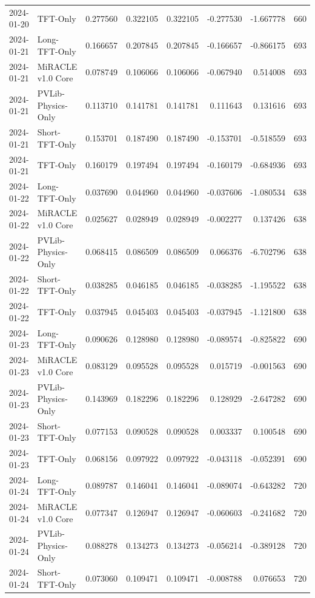 \begin{tabular}{llrrrrrr}
2024-01-20 & TFT-Only & 0.277560 & 0.322105 & 0.322105 & -0.277530 & -1.667778 & 660 \\
2024-01-21 & Long-TFT-Only & 0.166657 & 0.207845 & 0.207845 & -0.166657 & -0.866175 & 693 \\
2024-01-21 & MiRACLE v1.0 Core & 0.078749 & 0.106066 & 0.106066 & -0.067940 & 0.514008 & 693 \\
2024-01-21 & PVLib-Physics-Only & 0.113710 & 0.141781 & 0.141781 & 0.111643 & 0.131616 & 693 \\
2024-01-21 & Short-TFT-Only & 0.153701 & 0.187490 & 0.187490 & -0.153701 & -0.518559 & 693 \\
2024-01-21 & TFT-Only & 0.160179 & 0.197494 & 0.197494 & -0.160179 & -0.684936 & 693 \\
2024-01-22 & Long-TFT-Only & 0.037690 & 0.044960 & 0.044960 & -0.037606 & -1.080534 & 638 \\
2024-01-22 & MiRACLE v1.0 Core & 0.025627 & 0.028949 & 0.028949 & -0.002277 & 0.137426 & 638 \\
2024-01-22 & PVLib-Physics-Only & 0.068415 & 0.086509 & 0.086509 & 0.066376 & -6.702796 & 638 \\
2024-01-22 & Short-TFT-Only & 0.038285 & 0.046185 & 0.046185 & -0.038285 & -1.195522 & 638 \\
2024-01-22 & TFT-Only & 0.037945 & 0.045403 & 0.045403 & -0.037945 & -1.121800 & 638 \\
2024-01-23 & Long-TFT-Only & 0.090626 & 0.128980 & 0.128980 & -0.089574 & -0.825822 & 690 \\
2024-01-23 & MiRACLE v1.0 Core & 0.083129 & 0.095528 & 0.095528 & 0.015719 & -0.001563 & 690 \\
2024-01-23 & PVLib-Physics-Only & 0.143969 & 0.182296 & 0.182296 & 0.128929 & -2.647282 & 690 \\
2024-01-23 & Short-TFT-Only & 0.077153 & 0.090528 & 0.090528 & 0.003337 & 0.100548 & 690 \\
2024-01-23 & TFT-Only & 0.068156 & 0.097922 & 0.097922 & -0.043118 & -0.052391 & 690 \\
2024-01-24 & Long-TFT-Only & 0.089787 & 0.146041 & 0.146041 & -0.089074 & -0.643282 & 720 \\
2024-01-24 & MiRACLE v1.0 Core & 0.077347 & 0.126947 & 0.126947 & -0.060603 & -0.241682 & 720 \\
2024-01-24 & PVLib-Physics-Only & 0.088278 & 0.134273 & 0.134273 & -0.056214 & -0.389128 & 720 \\
2024-01-24 & Short-TFT-Only & 0.073060 & 0.109471 & 0.109471 & -0.008788 & 0.076653 & 720 \\

\end{tabular}
